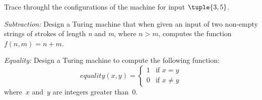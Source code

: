 \documentclass[../../include/open-logic-section]{subfiles}
\begin{document}
\begin{prob}
Trace throughl the configurations of the machine for input $\tuple{3,5}$.
\end{prob}

\begin{prob}
\emph{Subtraction:} Design a Turing machine that when given an input of two non-empty 
strings of strokes of length \emph{n} and \emph{m}, where $n > m$, computes the 
function $f(n,m) = n + m$. 
\end{prob}

\begin{prob}
\emph{Equality:} Design a Turing machine to compute the following function:
\[
equality(x,y) = 
\begin{cases}
  \text{1} & \text{if~$x = y$} \\
  \text{0} & \text{if~$x \neq y$}
\end{cases}
\]
where~$x$ and~$y$ are integers greater than~$0$.
\end{prob}
\end{document}

